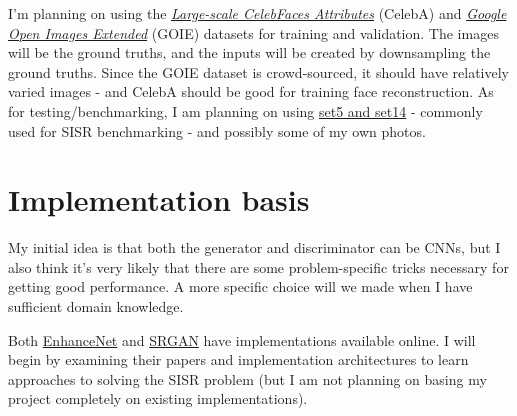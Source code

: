 \documentclass{article}
\begin{document}
I'm planning on using the \href{http://mmlab.ie.cuhk.edu.hk/projects/CelebA.html}{\textit{Large-scale CelebFaces Attributes}} (CelebA) and \href{https://storage.googleapis.com/openimages/web/extended.html}{\textit{Google Open Images Extended}} (GOIE) datasets for training and validation. The images will be the ground truths, and the inputs will be created by downsampling the ground truths. Since the GOIE dataset is crowd-sourced, it should have relatively varied images - and CelebA should be good for training face reconstruction. As for testing/benchmarking, I am planning on using \href{http://vllab.ucmerced.edu/wlai24/LapSRN/}{set5 and set14} - commonly used for SISR benchmarking - and possibly some of my own photos.


\section{Implementation basis}

My initial idea is that both the generator and discriminator can be CNNs, but I also think it's very likely that there are some problem-specific tricks necessary for getting good performance. A more specific choice will we made when I have sufficient domain knowledge.

Both \href{http://webdav.tuebingen.mpg.de/pixel/enhancenet/}{EnhanceNet} and \href{https://github.com/tensorlayer/srgan}{SRGAN} have implementations available online. I will begin by examining their papers and implementation architectures to learn approaches to solving the SISR problem (but I am not planning on basing my project completely on existing implementations).
\end{document}
